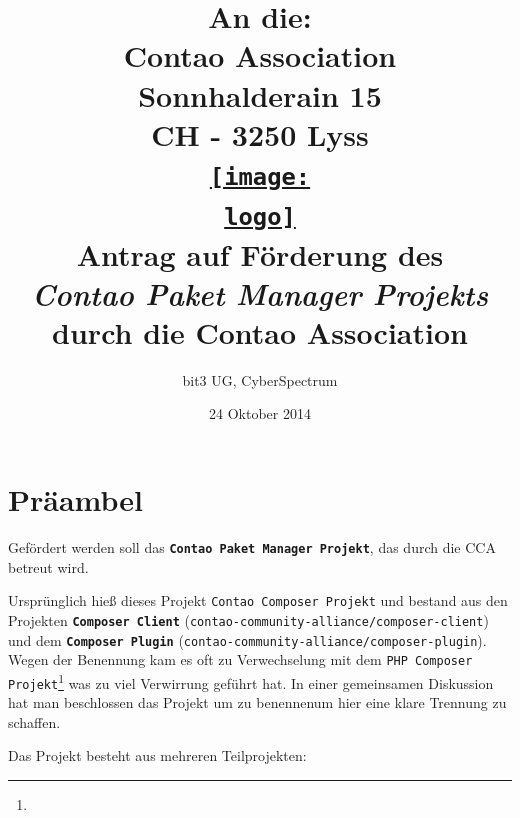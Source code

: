 \documentclass[
paper=a4,
draft=false,%
fontsize=10pt%
]{scrartcl}
\def\logo{logos/colorlogo_rgb}%
\newcommand{\contaoPackageManagerProject}{\textbf{\texttt{Contao Paket Manager Projekt}}}
\newcommand{\composerClient}{\textbf{\texttt{Composer Client}}}
\newcommand{\composerPlugin}{\textbf{\texttt{Composer Plugin}}}
\begin{document}
\title{%
An die:\\
Contao Association\\
Sonnhalderain 15\\
CH - 3250 Lyss\\
\href{http://c-c-a.org}{\texttt{[image: \\logo]}}\\
Antrag auf Förderung des \\
\textit{Contao Paket Manager Projekts} \\
durch die Contao Association\\%
}
\date{24 Oktober 2014}
\author{bit3 UG, CyberSpectrum}
\maketitle

\pagebreak

%
%

\section*{Präambel}
\label{sec:preamble}

Gefördert werden soll das \contaoPackageManagerProject{}, das durch die CCA betreut wird.

\begin{emquotation}
Ursprünglich hieß dieses Projekt \texttt{Contao Composer Projekt} und bestand aus den Projekten \composerClient{} (\texttt{contao-community-alliance/composer-client}) und dem \composerPlugin{} (\texttt{contao-community-alliance/composer-plugin}). Wegen der Benennung kam es oft zu Verwechselung mit dem \texttt{PHP Composer Projekt}\footnote{} was zu viel Verwirrung geführt hat. In einer gemeinsamen Diskussion hat man beschlossen das Projekt um zu benennen\footnotemark um hier eine klare Trennung zu schaffen.
\end{emquotation}


Das Projekt besteht aus mehreren Teilprojekten:
\end{document}
